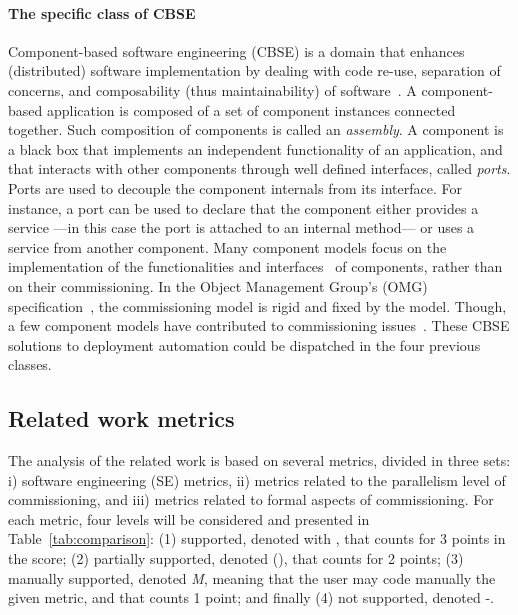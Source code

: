 \paragraph{The specific class of CBSE}
Component-based software engineering (CBSE) is a domain that enhances (distributed) software implementation by dealing with code re-use, separation of concerns, and composability (thus maintainability) of software~\cite{Szyperski:2002:CSB:515228}. A component-based application is composed of a set of component instances connected together. Such composition of components is called an \emph{assembly}. A component is a black box that implements an independent functionality of an application, and that interacts with
other components through well defined interfaces, called \emph{ports}. Ports are used to decouple the component internals from its interface. For instance, a port can be used to declare that the component either provides a service ---in this case the port is attached to an internal method--- or uses a service from another
component. Many component models focus on the implementation of the functionalities and
interfaces~\cite{corba:omg06,Blair2009,baude:hal-01001043,Bernholdt01052006,bigot:inria-00388508,Coullon2017} of components, rather than on their commissioning. In the Object Management Group's (OMG) specification~\cite{ccmdeploy:omg06}, the commissioning model is rigid and fixed by the model. Though, a few component models have contributed to commissioning issues~\cite{Blair2009, baude:hal-01001043, flissi2008ccgrid, chardet:hal-01858150, dicosmo2014ic}. These CBSE solutions to deployment automation could be dispatched in the four previous classes.

\subsection{Related work metrics}

The analysis of the related work is based on several metrics, divided in three sets: i) software engineering (SE) metrics, ii) metrics related to the parallelism level of commissioning, and iii) metrics related to formal aspects of commissioning. For each metric, four levels will be considered and presented in Table~\ref{tab:comparison}: (1) supported, denoted with \checkmark, that counts for 3 points in the score; (2) partially supported, denoted (\checkmark), that counts for 2 points; (3) manually supported, denoted \emph{M}, meaning that the user may code manually the given metric, and that counts 1 point; and finally
(4) not supported, denoted -.

